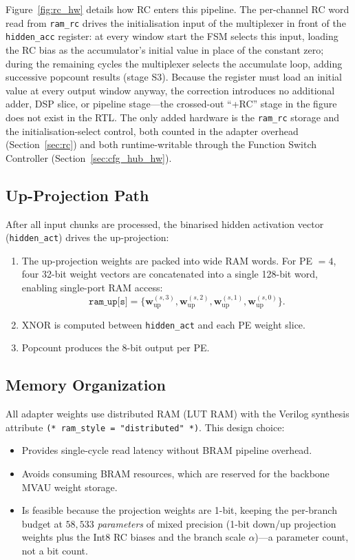 \documentclass[12pt, a4paper]{report}
\numberwithin{equation}{chapter}
\numberwithin{figure}{chapter}
\numberwithin{table}{chapter}
\numberwithin{algorithm}{chapter}
\begin{document}
Figure~\ref{fig:rc_hw} details how RC enters this pipeline. The per-channel RC word read from \texttt{ram\_rc} drives the initialisation input of the multiplexer in front of the \texttt{hidden\_acc} register: at every window start the FSM selects this input, loading the RC bias as the accumulator's initial value in place of the constant zero; during the remaining cycles the multiplexer selects the accumulate loop, adding successive popcount results (stage S3). Because the register must load an initial value at every output window anyway, the correction introduces no additional adder, DSP slice, or pipeline stage---the crossed-out ``+RC'' stage in the figure does not exist in the RTL. The only added hardware is the \texttt{ram\_rc} storage and the initialisation-select control, both counted in the adapter overhead (Section~\ref{sec:rc}) and both runtime-writable through the Function Switch Controller (Section~\ref{sec:cfg_hub_hw}).


\subsection{Up-Projection Path}

After all input chunks are processed, the binarised hidden activation vector (\texttt{hidden\_act}) drives the up-projection:

\begin{enumerate}
    \item The up-projection weights are packed into wide RAM words. For PE $= 4$, four 32-bit weight vectors are concatenated into a single 128-bit word, enabling single-port RAM access:
    \begin{equation}
    \texttt{ram\_up[s]} = \{\mathbf{w}_{\text{up}}^{(s,3)}, \mathbf{w}_{\text{up}}^{(s,2)}, \mathbf{w}_{\text{up}}^{(s,1)}, \mathbf{w}_{\text{up}}^{(s,0)}\}.
    \end{equation}
    \item XNOR is computed between \texttt{hidden\_act} and each PE weight slice.
    \item Popcount produces the 8-bit output per PE.
\end{enumerate}

\subsection{Memory Organization}

All adapter weights use distributed RAM (LUT RAM) with the Verilog synthesis attribute \texttt{(* ram\_style = "distributed" *)}. This design choice:
\begin{itemize}
    \item Provides single-cycle read latency without BRAM pipeline overhead.
    \item Avoids consuming BRAM resources, which are reserved for the backbone MVAU weight storage.
    \item Is feasible because the projection weights are 1-bit, keeping the per-branch budget at $58{,}533$ \emph{parameters} of mixed precision (1-bit down/up projection weights plus the Int8 RC biases and the branch scale $\alpha$)---a parameter count, not a bit count.
\end{itemize}
\end{document}

